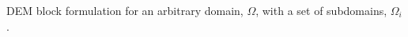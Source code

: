 \label{fig:DEM} DEM block formulation for an arbitrary domain, $\Omega$, with a set of subdomains, $\Omega_i$.